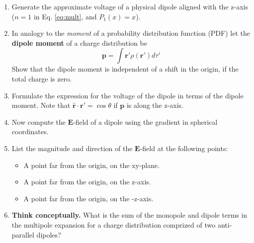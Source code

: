 \documentclass[10pt]{article}
\begin{document}
\begin{enumerate}
\item Generate the approximate voltage of a physical dipole aligned with the z-axis ($n=1$ in Eq. \ref{eq:mult}, and $P_1(x) = x$).  \\ \vspace{3.5cm}
\item In analogy to the \textit{moment} of a probability distribution function (PDF) let the \textbf{dipole moment} of a charge distribution be
\begin{equation}
\mathbf{p} = \int \mathbf{r}' \rho(\mathbf{r}') d\tau'
\end{equation}
Show that the dipole moment is independent of a shift in the origin, if the total charge is zero. \\ \vspace{3.5cm}
\item Formulate the expression for the voltage of the dipole in terms of the dipole moment.  Note that $\hat{\mathbf{r}} \cdot \mathbf{r}' = \cos\theta$ if $\mathbf{p}$ is along the z-axis. \\ \vspace{3.5cm}
\item Now compute the $\mathbf{E}$-field of a dipole using the gradient in spherical coordinates. \\ \vspace{3.5cm}
\item List the magnitude and direction of the $\mathbf{E}$-field at the following points:
\begin{itemize}
\item A point far from the origin, on the xy-plane.
\item A point far from the origin, on the z-axis.
\item A point far from the origin, on the -z-axis.
\end{itemize} \vspace{2cm}
\item \textbf{Think conceptually.} What is the sum of the monopole and dipole terms in the multipole expansion for a charge distribution comprized of two anti-parallel dipoles?
\end{enumerate}
\end{document}
